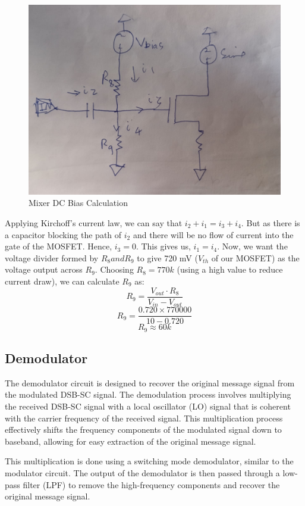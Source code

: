 \documentclass[conference]{IEEEtran}
\begin{document}
\begin{figure}
    \centering
    \includegraphics[width=0.85\linewidth]{Images/Mixer_Bias_Calculation.png}
    \caption{Mixer DC Bias Calculation}
\end{figure}

Applying Kirchoff's current law, we can say that $i_2 +i_1 = i_3 + i_4$. But as there is a capacitor blocking the path of $i_2$ and there will be no flow of current into the gate of the MOSFET. Hence, $i_3 = 0$. This gives us, $i_1 = i_4$. Now, we want the voltage divider formed by $R_8 and R_9$ to give 720 mV ($V_{th}$ of our MOSFET) as the voltage output across $R_9$. Choosing $R_8 = 770k$ (using a high value to reduce current draw), we can calculate $R_9$ as:
$$R_9 = \frac{V_{out} \cdot R_8}{V_{in} - V_{out}}$$
$$R_9 = \frac{0.720 \times 770000}{10 - 0.720}$$
$$R_9 \approx 60k$$


\subsection{Demodulator}
The demodulator circuit is designed to recover the original message signal from the modulated DSB-SC signal. The demodulation process involves multiplying the received DSB-SC signal with a local oscillator (LO) signal that is coherent with the carrier frequency of the received signal. This multiplication process effectively shifts the frequency components of the modulated signal down to baseband, allowing for easy extraction of the original message signal.

This multiplication is done using a switching mode demodulator, similar to the modulator circuit. The output of the demodulator is then passed through a low-pass filter (LPF) to remove the high-frequency components and recover the original message signal.
\end{document}
